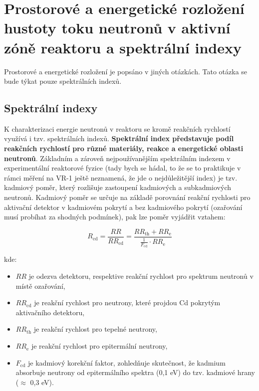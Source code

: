 \section[Prostorové a energetické rozložení hustoty toku, spektrální indexy]{Prostorové a energetické rozložení hustoty toku neutronů v aktivní zóně reaktoru a spektrální indexy}

Prostorové a energetické rozložení je popsáno v jiných otázkách. Tato otázka se bude týkat pouze spektrálních indexů.

\subsection{Spektrální indexy}

K charakterizaci energie neutronů v reaktoru se kromě reakčních rychlostí využívá i tzv. spektrálních indexů. \textbf{Spektrální index představuje podíl reakčních rychlostí pro různé materiály, reakce a energetické oblasti neutronů}. Základním a zároveň nejpoužívanějším spektrálním indexem v experimentální reaktorové fyzice (tady bych se hádal, to že se to praktikuje v rámci měření na VR-1 ještě neznamená, že jde o nejdůležitější index) je tzv. kadmiový poměr, který rozlišuje zastoupení kadmiových a subkadmiových neutronů. Kadmiový poměr se určuje na základě porovnání reakční rychlosti pro aktivační detektor v kadmiovém pokrytí a bez kadmiového pokrytí (ozařování musí probíhat za shodných podmínek), pak lze poměr vyjádřit vztahem:

\begin{equation}
    R_\text{cd} = \frac{RR}{RR_\text{cd}} = \frac{RR_\text{th} + RR_\text{e}}{\frac{1}{F_\text{cd}} \cdot RR_\text{e}}
\end{equation}

kde:

\begin{itemize}%
    \item $RR$ je odezva detektoru, respektive reakční rychlost pro spektrum neutronů v místě ozařování,
    \item $RR_\text{cd}$ je reakční rychlost pro neutrony, které projdou Cd pokrytým aktivačního detektoru,
    \item $RR_\text{th}$ je reakční rychlost pro tepelné neutrony,
    \item $RR_\text{e}$ je reakční rychlost pro epitermální neutrony,
    \item $F_\text{cd}$ je kadmiový korekční faktor, zohledňuje skutečnost, že kadmium absorbuje neutrony od epitermálního spektra (0,1 eV) do tzv. kadmiové hrany ($\approx$ 0,3 eV).
\end{itemize}

